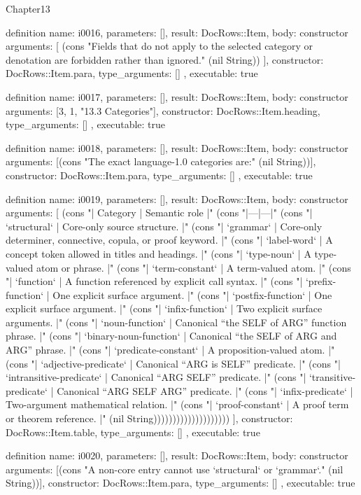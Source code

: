 \begin{lexlean}{Chapter13}
\begin{semanticmodule}
definition{
  name: i0016,
  parameters: [],
  result: DocRows::Item,
  body: constructor{
    arguments: [
      (cons "Fields that do not apply to the selected category or denotation are forbidden rather than ignored." (nil String))
    ],
    constructor: DocRows::Item.para,
    type_arguments: []
  },
  executable: true
}

definition{
  name: i0017,
  parameters: [],
  result: DocRows::Item,
  body: constructor{
    arguments: [3, 1, "13.3 Categories"],
    constructor: DocRows::Item.heading,
    type_arguments: []
  },
  executable: true
}

definition{
  name: i0018,
  parameters: [],
  result: DocRows::Item,
  body: constructor{
    arguments: [(cons "The exact language-1.0 categories are:" (nil String))],
    constructor: DocRows::Item.para,
    type_arguments: []
  },
  executable: true
}

definition{
  name: i0019,
  parameters: [],
  result: DocRows::Item,
  body: constructor{
    arguments: [
      (cons "| Category | Semantic role |" (cons "|---|---|" (cons "| `structural` | Core-only source structure. |" (cons "| `grammar` | Core-only determiner, connective, copula, or proof keyword. |" (cons "| `label-word` | A concept token allowed in titles and headings. |" (cons "| `type-noun` | A type-valued atom or phrase. |" (cons "| `term-constant` | A term-valued atom. |" (cons "| `function` | A function referenced by explicit call syntax. |" (cons "| `prefix-function` | One explicit surface argument. |" (cons "| `postfix-function` | One explicit surface argument. |" (cons "| `infix-function` | Two explicit surface arguments. |" (cons "| `noun-function` | Canonical “the SELF of ARG” function phrase. |" (cons "| `binary-noun-function` | Canonical “the SELF of ARG and ARG” phrase. |" (cons "| `predicate-constant` | A proposition-valued atom. |" (cons "| `adjective-predicate` | Canonical “ARG is SELF” predicate. |" (cons "| `intransitive-predicate` | Canonical “ARG SELF” predicate. |" (cons "| `transitive-predicate` | Canonical “ARG SELF ARG” predicate. |" (cons "| `infix-predicate` | Two-argument mathematical relation. |" (cons "| `proof-constant` | A proof term or theorem reference. |" (nil String))))))))))))))))))))
    ],
    constructor: DocRows::Item.table,
    type_arguments: []
  },
  executable: true
}

definition{
  name: i0020,
  parameters: [],
  result: DocRows::Item,
  body: constructor{
    arguments: [(cons "A non-core entry cannot use `structural` or `grammar`." (nil String))],
    constructor: DocRows::Item.para,
    type_arguments: []
  },
  executable: true
}


\end{semanticmodule}
\end{lexlean}
